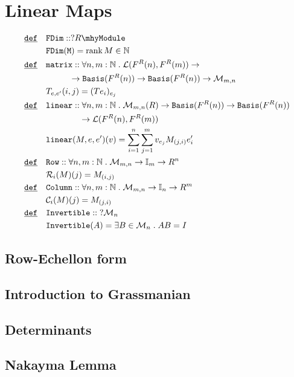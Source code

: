 \documentclass[12pt]{article}
\DeclareMathOperator*{\rk}{\mathrm{rank}}
\renewcommand{\.}{\; . \;}
\newcommand{\nat}{\mathbb{N}}
\newcommand{\De}{\underline{\mathtt{def}} \quad}
\newcommand{\module}[1]{{#1} \mhy \mathtt{Module}}
\newcommand{\basis}{\mathtt{Basis}}
\begin{document}
\section{Linear Maps}
\begin{align*}
\De & \mathtt{FDim} :: ?\module{R} \\
 &  \mathtt{FDim(M)} = \rk M \in \nat \\
\De & \mathtt{matrix} :: \forall n, m : \nat \. \mathcal{L}(F^R(n),F^R(m)) \to \\ 
	& \kern 2.3pc \to \basis(F^R(n)) \to \basis(F^R(n)) \to \mathcal{M}_{m,n} \\
   &   T_{e,e'}(i,j) = (Te_i)_{e_j}    \\
\De & \mathtt{linear} :: \forall n, m : \nat \. \mathcal{M}_{m,n}(R)   
	  \to \basis(F^R(n)) \to \basis(F^R(n)) \\ & \kern 3.3pc \to  \mathcal{L}(F^R(n),F^R(m)) \\
   &  \mathtt{linear}(M,e,e')(v) = \sum^n_{i =1 }\sum^m_{j = 1 } v_{e_j}M_{(j,i)}e'_i \\
\De & \mathtt{Row} :: \forall n,m : \nat \. \mathcal{M}_{m,n} \to \mathbb{I}_m \to R^n \\
   &  \mathcal{R}_i(M)(j) = M_{(i,j)} \\
\De & \mathtt{Column} :: \forall n,m : \nat \. \mathcal{M}_{m,n} \to \mathbb{I}_n \to R^m \\
   &  \mathcal{C}_i(M)(j) = M_{(j,i)} \\
\De & \mathtt{Invertible} :: \; ? \mathcal{M}_n \\
	& \mathtt{Invertible}(A) = \exists B \in \mathcal{M}_n \. AB = I
\end{align*}
\subsection{Row-Echellon form}
\subsection{Introduction to Grassmanian}
\subsection{Determinants}
\subsection{Nakayma Lemma}
\newpage
\end{document}
